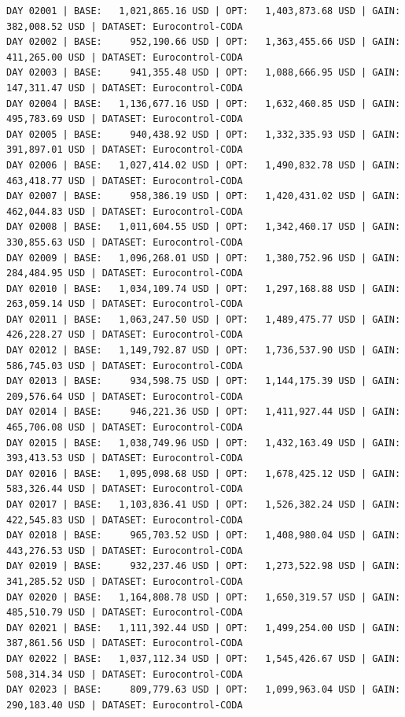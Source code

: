 \documentclass[11pt,a4paper]{article}
\begin{document}
\begin{verbatim}
DAY 02001 | BASE:   1,021,865.16 USD | OPT:   1,403,873.68 USD | GAIN: 382,008.52 USD | DATASET: Eurocontrol-CODA
DAY 02002 | BASE:     952,190.66 USD | OPT:   1,363,455.66 USD | GAIN: 411,265.00 USD | DATASET: Eurocontrol-CODA
DAY 02003 | BASE:     941,355.48 USD | OPT:   1,088,666.95 USD | GAIN: 147,311.47 USD | DATASET: Eurocontrol-CODA
DAY 02004 | BASE:   1,136,677.16 USD | OPT:   1,632,460.85 USD | GAIN: 495,783.69 USD | DATASET: Eurocontrol-CODA
DAY 02005 | BASE:     940,438.92 USD | OPT:   1,332,335.93 USD | GAIN: 391,897.01 USD | DATASET: Eurocontrol-CODA
DAY 02006 | BASE:   1,027,414.02 USD | OPT:   1,490,832.78 USD | GAIN: 463,418.77 USD | DATASET: Eurocontrol-CODA
DAY 02007 | BASE:     958,386.19 USD | OPT:   1,420,431.02 USD | GAIN: 462,044.83 USD | DATASET: Eurocontrol-CODA
DAY 02008 | BASE:   1,011,604.55 USD | OPT:   1,342,460.17 USD | GAIN: 330,855.63 USD | DATASET: Eurocontrol-CODA
DAY 02009 | BASE:   1,096,268.01 USD | OPT:   1,380,752.96 USD | GAIN: 284,484.95 USD | DATASET: Eurocontrol-CODA
DAY 02010 | BASE:   1,034,109.74 USD | OPT:   1,297,168.88 USD | GAIN: 263,059.14 USD | DATASET: Eurocontrol-CODA
DAY 02011 | BASE:   1,063,247.50 USD | OPT:   1,489,475.77 USD | GAIN: 426,228.27 USD | DATASET: Eurocontrol-CODA
DAY 02012 | BASE:   1,149,792.87 USD | OPT:   1,736,537.90 USD | GAIN: 586,745.03 USD | DATASET: Eurocontrol-CODA
DAY 02013 | BASE:     934,598.75 USD | OPT:   1,144,175.39 USD | GAIN: 209,576.64 USD | DATASET: Eurocontrol-CODA
DAY 02014 | BASE:     946,221.36 USD | OPT:   1,411,927.44 USD | GAIN: 465,706.08 USD | DATASET: Eurocontrol-CODA
DAY 02015 | BASE:   1,038,749.96 USD | OPT:   1,432,163.49 USD | GAIN: 393,413.53 USD | DATASET: Eurocontrol-CODA
DAY 02016 | BASE:   1,095,098.68 USD | OPT:   1,678,425.12 USD | GAIN: 583,326.44 USD | DATASET: Eurocontrol-CODA
DAY 02017 | BASE:   1,103,836.41 USD | OPT:   1,526,382.24 USD | GAIN: 422,545.83 USD | DATASET: Eurocontrol-CODA
DAY 02018 | BASE:     965,703.52 USD | OPT:   1,408,980.04 USD | GAIN: 443,276.53 USD | DATASET: Eurocontrol-CODA
DAY 02019 | BASE:     932,237.46 USD | OPT:   1,273,522.98 USD | GAIN: 341,285.52 USD | DATASET: Eurocontrol-CODA
DAY 02020 | BASE:   1,164,808.78 USD | OPT:   1,650,319.57 USD | GAIN: 485,510.79 USD | DATASET: Eurocontrol-CODA
DAY 02021 | BASE:   1,111,392.44 USD | OPT:   1,499,254.00 USD | GAIN: 387,861.56 USD | DATASET: Eurocontrol-CODA
DAY 02022 | BASE:   1,037,112.34 USD | OPT:   1,545,426.67 USD | GAIN: 508,314.34 USD | DATASET: Eurocontrol-CODA
DAY 02023 | BASE:     809,779.63 USD | OPT:   1,099,963.04 USD | GAIN: 290,183.40 USD | DATASET: Eurocontrol-CODA

\end{verbatim}
\end{document}

